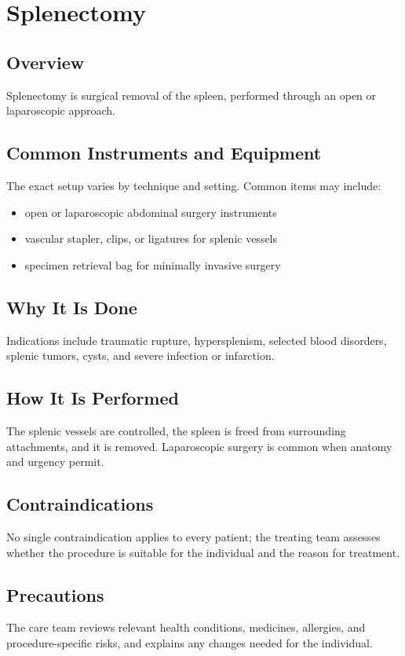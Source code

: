 \chapter{Splenectomy}
\section*{Overview}
Splenectomy is surgical removal of the spleen, performed through an open or laparoscopic approach.
\section*{Common Instruments and Equipment}
The exact setup varies by technique and setting. Common items may include:
\begin{itemize}[nosep,leftmargin=*]
  \item open or laparoscopic abdominal surgery instruments
  \item vascular stapler, clips, or ligatures for splenic vessels
  \item specimen retrieval bag for minimally invasive surgery
\end{itemize}

\section*{Why It Is Done}
Indications include traumatic rupture, hypersplenism, selected blood disorders, splenic tumors, cysts, and severe infection or infarction.
\section*{How It Is Performed}
The splenic vessels are controlled, the spleen is freed from surrounding attachments, and it is removed. Laparoscopic surgery is common when anatomy and urgency permit.
\section*{Contraindications}
No single contraindication applies to every patient; the treating team assesses whether the procedure is suitable for the individual and the reason for treatment.

\section*{Precautions}
The care team reviews relevant health conditions, medicines, allergies, and procedure-specific risks, and explains any changes needed for the individual.

